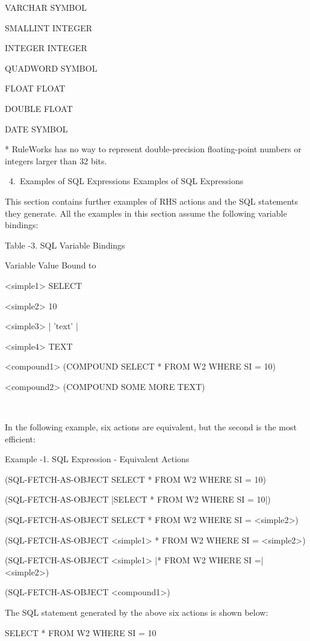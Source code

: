      VARCHAR  SYMBOL

      SMALLINT  INTEGER

      INTEGER  INTEGER

      QUADWORD  SYMBOL

      FLOAT  FLOAT

      DOUBLE  FLOAT

      DATE  SYMBOL

      * RuleWorks has no way to represent
      double-precision floating-point numbers or
      integers larger than 32 bits.

   4. Examples of SQL Expressions Examples of SQL
      Expressions

This section contains further examples of RHS
actions and the SQL statements they generate. All
the examples in this section assume the following
variable bindings:

Table -3. SQL Variable Bindings

     Variable  Value Bound to

     <simple1>  SELECT

     <simple2>  10

     <simple3>   | 'text' |

     <simple4>  TEXT

     <compound1>  (COMPOUND SELECT * FROM W2 WHERE
     SI = 10)

     <compound2>  (COMPOUND SOME MORE TEXT)

      

In the following example, six actions are
equivalent, but the second is the most efficient:

Example -1. SQL Expression - Equivalent Actions

        (SQL-FETCH-AS-OBJECT SELECT * FROM W2 WHERE
        SI = 10)

        (SQL-FETCH-AS-OBJECT |SELECT * FROM W2
        WHERE SI = 10|)

        (SQL-FETCH-AS-OBJECT SELECT * FROM W2 WHERE
        SI = <simple2>)

        (SQL-FETCH-AS-OBJECT <simple1> * FROM W2
        WHERE SI = <simple2>)

        (SQL-FETCH-AS-OBJECT <simple1> |* FROM W2
        WHERE SI =| <simple2>)

        (SQL-FETCH-AS-OBJECT <compound1>)

The SQL statement generated by the above six
actions is shown below:

        SELECT * FROM W2 WHERE SI = 10

